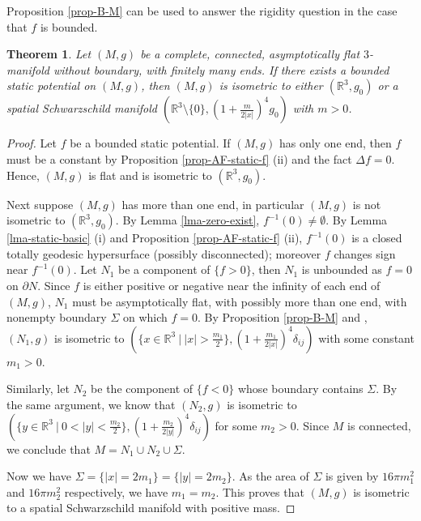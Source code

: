 \documentclass[12pt]{amsart}
\newtheorem{thm}{Theorem}[section]
\theoremstyle{remark}
\numberwithin{equation}{section}
\newcommand{\R}{\mathbb R}
\def\p{\partial}
\def\lf{\left}
\def\ri{\right}
\begin{document}
Proposition \ref{prop-B-M} can be used to answer  the rigidity question in the case that   $f$ is bounded.


\begin{thm} \label{thm-rigidity-bounded}
Let $(M,g)$ be a complete, connected, asymptotically flat $3$-manifold without boundary, with finitely many ends.
If there exists   a  bounded static potential  on $(M, g)$,
then $(M, g)$ is  isometric  to either $(\R^3, g_0)$ or  a  spatial Schwarzschild manifold
$ ( \R^3 \setminus \{ 0  \},  ( 1 + \frac{  m}{ 2 | x | }  )^4 g_0 ) $ with $m>0$.
\end{thm}


\begin{proof}   Let $f$ be a bounded static potential.
If $(M, g)$ has only one end, then $f$ must be a constant by Proposition \ref{prop-AF-static-f} (ii) and the fact $ \Delta f = 0 $.
Hence, $(M, g)$ is flat and is isometric to $(\R^3, g_0)$.

Next suppose  $(M, g)$  has more than one end,
in particular $(M, g)$ is not isometric to $(\R^3, g_0)$.
By Lemma \ref{lma-zero-exist},   $ f^{-1} (0) \neq \emptyset $.
By  Lemma \ref{lma-static-basic} (i) and Proposition \ref{prop-AF-static-f} (ii),    $ f^{-1}(0)   $ is a  closed totally geodesic hypersurface (possibly disconnected);
moreover $f$ changes sign near $f^{-1}(0) $.
Let $N_1$ be a component of   $\{f>0\}$, then
$N_1$ is  unbounded as $f = 0 $ on $\p N$.
Since $ f $ is either positive or  negative near the infinity of each end of $(M, g)$,
$N_1$ must be  asymptotically flat, with possibly more than one end, with nonempty  boundary $\Sigma$ on which  $f=0$.
By Proposition  \ref{prop-B-M} and \cite{Bunting-Masood},  $(N_1,g)$ is
isometric to
$ \lf( \{x\in \R^3 \ | \  |x|> \frac{m_1}{2} \}, \lf(1+\frac{m_1}{2 |x|}\ri)^4\delta_{ij} \ri)
$
with some constant $ m_1 > 0$.


Similarly, let  $N_2$ be the component of $\{f<0\}$ whose  boundary contains  $\Sigma$. By the same argument,  we know
that $(N_2,g)$ is isometric to $ \lf( \{y \in \R^3 \ | \  0<|y|< \frac{m_2}{2} \},  \lf(1+\frac{m_2}{2 |y|}\ri)^4\delta_{ij} \ri) $ for some $m_2 > 0 $.
Since $M$ is connected, we conclude that
 $M= N_1\cup N_2\cup \Sigma$.

Now we have $\Sigma=\{|x|=2m_1\}=\{|y|=2m_2\}$.
As the area of $\Sigma$ is given by $ 16 \pi m_1^2$ and $ 16 \pi m_2^2$ respectively, we have
$ m_1 = m_2 .$
This proves that  $(M,g)$ is isometric to a  spatial Schwarzschild manifold with positive mass.
\end{proof}
\end{document}
